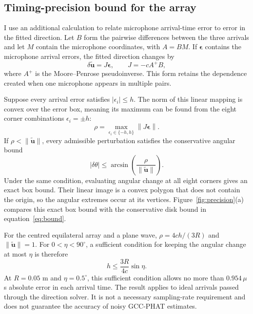 \documentclass{edpsci}
\begin{document}
\subsection{Timing-precision bound for the array}

I use an additional calculation to relate microphone arrival-time error to error in the fitted direction. Let $B$ form the pairwise differences between the three arrivals and let $M$ contain the microphone coordinates, with $A=BM$. If $\boldsymbol\epsilon$ contains the microphone arrival errors, the fitted direction changes by
\begin{equation}
	\delta\widetilde{\mathbf u}
	=
	J\boldsymbol\epsilon,
	\qquad
	J=-cA^+B,
\end{equation}
where $A^+$ is the Moore--Penrose pseudoinverse. This form retains the dependence created when one microphone appears in multiple pairs.

Suppose every arrival error satisfies $|\epsilon_i|\leq h$. The norm of this linear mapping is convex over the error box, meaning its maximum can be found from the eight corner combinations $\epsilon_i=\pm h$:
\begin{equation}
	\rho
	=
	\max_{\epsilon_i\in\{-h,h\}}
	\left\|J\boldsymbol\epsilon\right\|.
\end{equation}
If $\rho<\|\widetilde{\mathbf u}\|$, every admissible perturbation satisfies the conservative angular bound
\begin{equation}
	|\delta\theta|
	\leq
	\arcsin\!\left(
	\frac{\rho}{\|\widetilde{\mathbf u}\|}
	\right).
	\label{eq:bound}
\end{equation}
Under the same condition, evaluating angular change at all eight corners gives an exact box bound. Their linear image is a convex polygon that does not contain the origin, so the angular extremes occur at its vertices. Figure~\ref{fig:precision}(a) compares this exact box bound with the conservative disk bound in equation~\ref{eq:bound}.

For the centred equilateral array and a plane wave, $\rho=4ch/(3R)$ and $\|\widetilde{\mathbf u}\|=1$. For $0<\eta<90^\circ$, a sufficient condition for keeping the angular change at most $\eta$ is therefore
\begin{equation}
	h
	\leq
	\frac{3R}{4c}\sin\eta.
\end{equation}
At $R=0.05$ m and $\eta=0.5^\circ$, this sufficient condition allows no more than $0.954\,\mu$s absolute error in each arrival time. The result applies to ideal arrivals passed through the direction solver. It is not a necessary sampling-rate requirement and does not guarantee the accuracy of noisy GCC-PHAT estimates.
\end{document}
